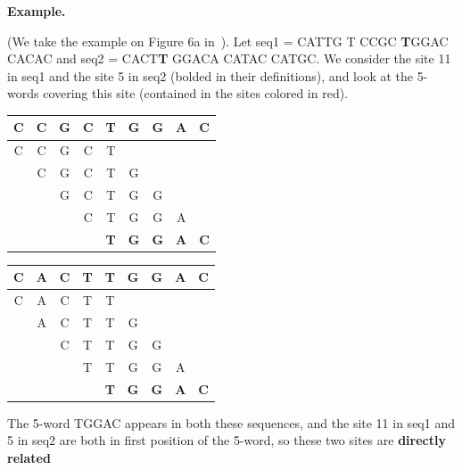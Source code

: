 \documentclass[english,13pt,a4paper]{article}
\theoremstyle{definition}
\newtheorem*{example}{Example}
\theoremstyle{remark}
\theoremstyle{defstyle}
\renewenvironment{example}[1][]{
    \par\noindent\textbf{Example.}%
    \begin{mdframed}[
        linewidth=.8pt,
        linecolor=darkgray,
        bottomline=false,
        topline=false,
        rightline=false,
        innerrightmargin=0pt,
        innertopmargin=0pt,
        innerbottommargin=0pt,
        innerleftmargin=1em,%
        skipabove=.5\baselineskip
    ]}
    {\end{mdframed}}
\begin{document}
\begin{example}
    (We take the example on Figure 6a in~\cite{didier_comparing_2007}). Let seq1 = CATTG T{\color{red} CCGC \textbf{T}GGAC} CACAC and seq2 = {\color{red} CACT\textbf{T} GGAC}A CATAC CATGC. We consider the site 11 in seq1 and the site 5 in seq2 (bolded in their definitions), and look at the 5-words covering this site (contained in the sites colored in red).\\

    \begin{minipage}{.47\textwidth}
        \begin{tabular}{*4c | c | *4c}
            \cline{5-5}
            C & C & G & C & \textbf{T} & G & G & A & C \\
            \hline
            C & C & G & C & T &   &   &   &  \\
              & C & G & C & T & G &   &   &  \\
              &   & G & C & T & G & G &   &  \\
              &   &   & C & T & G & G & A &  \\
              &   &   &   & \textbf{T} & \textbf{G} & \textbf{G} & \textbf{A} & \textbf{C} \\
            \cline{5-5}
        \end{tabular}
    \end{minipage}
    \begin{minipage}{.47\textwidth}
        \begin{tabular}{*4c | c | *4c}
            \cline{5-5}
            C & A & C & T & \textbf{T} & G & G & A & C \\
            \hline
            C & A & C & T & T &   &   &   &  \\
              & A & C & T & T & G &   &   &  \\
              &   & C & T & T & G & G &   &  \\
              &   &   & T & T & G & G & A &  \\
              &   &   &   & \textbf{T} & \textbf{G} & \textbf{G} & \textbf{A} & \textbf{C} \\
            \cline{5-5}
        \end{tabular}
    \end{minipage}

    \noindent
    The 5-word TGGAC appears in both these sequences, and the site 11 in seq1 and 5 in seq2 are both in first position of the 5-word, so these two sites are \textbf{directly related}
\end{example}
\end{document}
